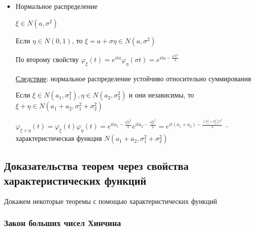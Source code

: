 \begin{itemize}
    $f_\xi(x) = \frac{1}{2\pi} e^{-\frac{x^2}{2}}$

    $\varphi_\xi(t) = Ee^{it\xi} = \int_{-\infty}^{\infty} e^{itx} f_\xi(x) dx = \int_{-\infty}^\infty e^{itx} \frac{1}{\sqrt{2\pi}} e^{-\frac{x^2}{2}} dx = 
    \frac{1}{\sqrt{2\pi}} \int_{-\infty}^\infty e^{-\frac{1}{2}(x^2 - 2itx)} dx = \\
    \frac{1}{\sqrt{2\pi}} \int_{-\infty}^{\infty} e^{-\frac{1}{2}(x^2 - 2itx - t^2) e^{-\frac{t^2}{2}}} dx = 
    \frac{1}{\sqrt{2\pi}} \int_{-\infty}^{\infty} e^{-\frac{(x - it)^2}{2}} d(x - it) = \frac{1}{\sqrt{2\pi}} e^{-\frac{t^2}{2}} \sqrt{2\pi} = e^{-\frac{t^2}{2}}$

    \item Нормальное распределение

    $\xi \in N(a, \sigma^2)$

    Если $\eta \in N(0, 1)$, то $\xi = a + \sigma \eta \in N(a, \sigma^2)$

    По второму свойству $\varphi_\xi(t) = e^{ita} \varphi_\eta(\sigma t) = e^{ita - \frac{\sigma^2t^2}{2}}$

    \underline{Следствие}: нормальное распределение устойчиво относительно суммирования

    \begin{MyTheorem}
        Если $\xi \in N(a_1, \sigma_1^2), \eta \in N(a_2, \sigma^2_2)$ и они независимы, то $\xi + \eta \in N(a_1 + a_2, \sigma_1^2 + \sigma_2^2)$
    \end{MyTheorem}

    \begin{MyProof}
        $\varphi_{\xi + \eta}(t) = \varphi_\xi(t) \varphi_\eta(t) = e^{ita_1 - \frac{\sigma_1^2t^2}{2}} e^{ita_2 - \frac{\sigma_2^2t^2}{2}} = e^{it(a_1 + a_2) - \frac{(\sigma_1^2 + \sigma_2^2)t^2}{2}}$ -- 
        характеристическая функция $N(a_1 + a_2, \sigma_1^2 + \sigma_2^2)$
    \end{MyProof}
\end{itemize}

\mediumvspace

\subsection{Доказательства теорем через свойства характеристических функций}

Докажем некоторые теоремы с помощью характеристических функций

\subsubsection{Закон больших чисел Хинчина}

